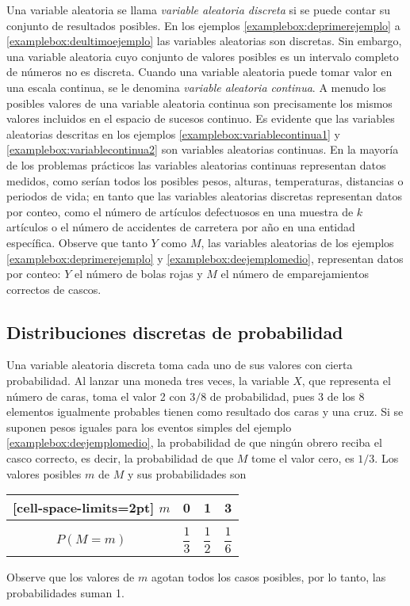 Una variable aleatoria se llama \emph{variable aleatoria discreta} si se puede contar su conjunto de resultados posibles. En los ejemplos \ref{examplebox:deprimerejemplo} a \ref{examplebox:deultimoejemplo} las variables aleatorias son discretas. Sin embargo, una variable aleatoria cuyo conjunto de valores posibles es un intervalo completo de números no es discreta. Cuando una variable aleatoria puede tomar valor en una escala continua, se le denomina \emph{variable aleatoria continua}. A menudo los posibles valores de una variable aleatoria continua son precisamente los mismos valores incluidos en el espacio de sucesos continuo. Es evidente que las variables aleatorias descritas en los ejemplos \ref{examplebox:variablecontinua1} y \ref{examplebox:variablecontinua2} son variables aleatorias continuas. En la mayoría de los problemas prácticos las variables aleatorias continuas representan datos medidos, como serían todos los posibles pesos, alturas, temperaturas, distancias o periodos de vida; en tanto que las variables aleatorias discretas representan datos por conteo, como el número de artículos defectuosos en una muestra de $k$ artículos o el número de accidentes de carretera por año en una entidad específica. Observe que tanto $Y$ como $M$, las variables aleatorias de los ejemplos \ref{examplebox:deprimerejemplo} y \ref{examplebox:deejemplomedio}, representan datos por conteo: $Y$ el número de bolas rojas y $M$ el número de emparejamientos correctos de cascos.

\subsection*{Distribuciones discretas de probabilidad}

Una variable aleatoria discreta toma cada uno de sus valores con cierta probabilidad. Al lanzar una moneda tres veces, la variable $X$, que representa el número de caras, toma el valor 2 con $3/8$ de probabilidad, pues 3 de los 8 elementos igualmente probables tienen como resultado dos caras y una cruz. Si se suponen pesos iguales para los eventos simples del ejemplo \ref{examplebox:deejemplomedio}, la probabilidad de que ningún obrero reciba el casco correcto, es decir, la probabilidad de que $M$ tome el valor cero, es $1/3$. Los valores posibles $m$ de $M$ y sus probabilidades son
\begin{nscenter}
    \begin{NiceTabular}{c|ccc}[cell-space-limits=2pt]
        $m$ & 0 & 1 & 3 \\
        \hline \\[-3.5mm]
        $P(M = m)$ & $\dfrac{1}{3}$ & $\dfrac{1}{2}$ & $\dfrac{1}{6}$
    \end{NiceTabular}
\end{nscenter}
Observe que los valores de $m$ agotan todos los casos posibles, por lo tanto, las probabilidades suman 1.

